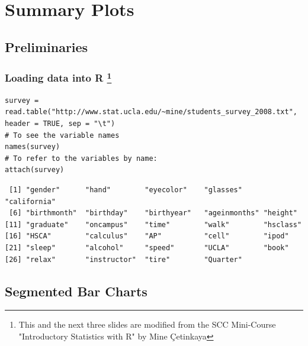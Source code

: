 

\section[Summary]{Summary Plots}

\subsection{Preliminaries}

\begin{frame}[fragile]

\frametitle{Loading data into R \footnote{This and the next three slides are modified from the SCC Mini-Course\\ "Introductory Statistics with R" by Mine \c{C}etinkaya}}

\begin{lstlisting}
survey = read.table("http://www.stat.ucla.edu/~mine/students_survey_2008.txt", header = TRUE, sep = "\t")
# To see the variable names
names(survey)
# To refer to the variables by name:
attach(survey)
\end{lstlisting}

			\begin{beamerboxesrounded}[shadow=true]{}
			\ttfamily \tiny
			\begin{verbatim}
 [1] "gender"      "hand"        "eyecolor"    "glasses"     "california" 
 [6] "birthmonth"  "birthday"    "birthyear"   "ageinmonths" "height"     
[11] "graduate"    "oncampus"    "time"        "walk"        "hsclass"    
[16] "HSCA"        "calculus"    "AP"          "cell"        "ipod"       
[21] "sleep"       "alcohol"     "speed"       "UCLA"        "book"       
[26] "relax"       "instructor"  "tire"        "Quarter"   
			\end{verbatim}
			\end{beamerboxesrounded}
\normalsize
\end{frame}

\subsection{Segmented Bar Charts}

